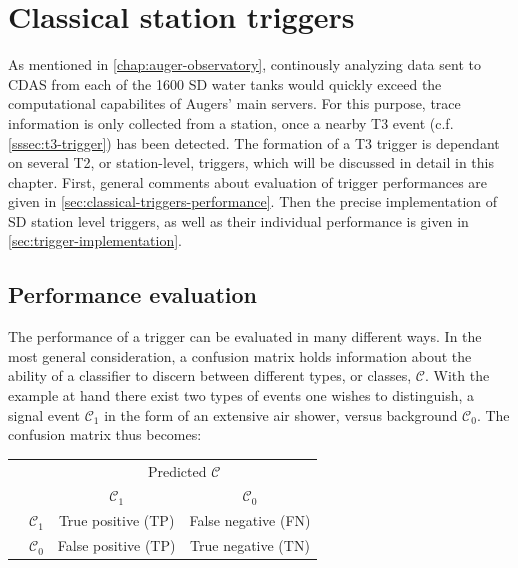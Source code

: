 
\chapter{Classical station triggers}
\label{chap:classical-triggers}

As mentioned in \autoref{chap:auger-observatory}, continously analyzing data sent to CDAS from each of the 1600 SD water tanks would quickly exceed the 
computational capabilites of Augers' main servers. For this purpose, trace information is only collected from a station, once a nearby T3 event 
(c.f. \autoref{sssec:t3-trigger}) has been detected. The formation of a T3 trigger is dependant on several T2, or station-level, triggers, which will
be discussed in detail in this chapter. First, general comments about evaluation of trigger performances are given in 
\autoref{sec:classical-triggers-performance}. Then the precise implementation of SD station level triggers, as well as their individual performance is given in 
\autoref{sec:trigger-implementation}.

\section{Performance evaluation}
\label{sec:classical-triggers-performance}

The performance of a trigger can be evaluated in many different ways. In the most general consideration, a confusion matrix holds information about the ability of 
a classifier to discern between different types, or classes, $\mathcal{C}$. With the example at hand there exist two types of events one wishes to distinguish, a 
signal event $\mathcal{C}_1$ in the form of an extensive air shower, versus background $\mathcal{C}_0$. The confusion matrix thus becomes:

\begingroup
\renewcommand{\arraystretch}{1.5}
\begin{center}
	\begin{tabular}{@{}cc c|c@{}}
		\multicolumn{1}{c}{} &\multicolumn{1}{c}{} &\multicolumn{2}{c}{\scriptsize Predicted $\mathcal{C}$ \normalsize} \\ 
		\multicolumn{1}{c}{} & 
		\multicolumn{1}{c}{} & 
		\multicolumn{1}{c}{$\mathcal{C}_1$} & 
		\multicolumn{1}{c}{$\mathcal{C}_0$} \\ 
		\cline{2-4}
		\multirow[c]{2}{*}{\rotatebox[origin=tr]{90}{\scriptsize True $\mathcal{C}$ \normalsize}}
		& $\mathcal{C}_1$  & True positive (TP) & False negative (FN)   \\
		\cline{3-4}
		& $\mathcal{C}_0$  & False positive (TP) & True negative (TN) \\ 
		\cline{2-4}
	\end{tabular}
\end{center}
\endgroup

